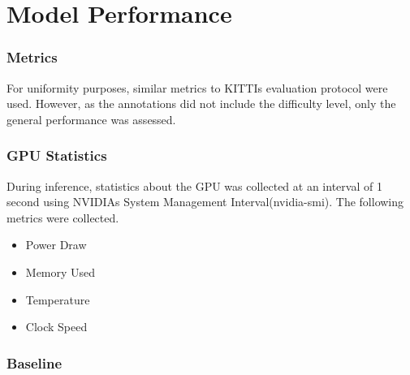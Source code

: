 \section{Model Performance }
\subsubsection{Metrics}

For uniformity purposes, similar metrics to KITTIs evaluation protocol were used. However, as the annotations did not include the difficulty level, only the general performance was assessed. 
\subsubsection{GPU Statistics}
During inference, statistics about the GPU was collected at an interval of 1 second using NVIDIAs System Management Interval(nvidia-smi). The following metrics were collected. 
\begin{itemize}[noitemsep]
	\item Power Draw
	\item Memory Used 
	\item Temperature 
	\item Clock Speed
\end{itemize}


\subsubsection*{Baseline}




